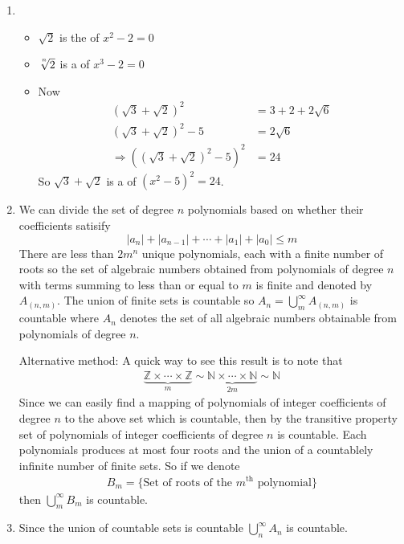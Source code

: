 \begin{enumerate}[label=(\alph*)]
    \item
    \begin{itemize}
        \item $\sqrt 2$ is the \soln of $x^2-2=0$
        \item $\sqrt[\uproot{3} n]{2}$ is a \soln of $x^3 - 2=0$
        \item 
        Now
        \begin{align*}
            (\sqrt 3 + \sqrt 2)^2 &= 3 + 2 + 2 \sqrt 6 \\
            (\sqrt 3 + \sqrt 2)^2 - 5 &= 2 \sqrt 6 \\
            \Rightarrow ((\sqrt 3 + \sqrt 2)^2 - 5)^2 &= 24
        \end{align*}
        So $\sqrt 3 + \sqrt 2$ is a \soln of $(x^2-5)^2 = 24$.
    \end{itemize}

    \item
    We can divide the set of degree $n$ polynomials based on whether their coefficients 
    satisify
    \begin{equation*}
        |a_n| + |a_{n-1}| + \cdots + |a_1| + |a_0| \leq m
    \end{equation*}
    There are less than $2m^n$ unique polynomials, each with a finite number of roots so 
    the set of algebraic numbers obtained from polynomials of degree $n$ with terms 
    summing to less than or equal to $m$ is finite and denoted by $A_{(n,m)}$. 
    The union of finite sets is countable so $A_n = \bigcup_m^{\infty} A_{(n,m)}$ is countable
    where $A_n$ denotes the set of all algebraic numbers obtainable from polynomials of 
    degree $n$.

    Alternative method:
    A quick way to see this result is to note that 
    \begin{align*}
        \underbrace{\mathbb{Z} \times \cdots \times \mathbb{Z}}_{m} \sim \underbrace{\mathbb{N} \times \cdots \times \mathbb{N}}_{2m} \sim \mathbb{N}
    \end{align*}
    Since we can easily find a mapping of polynomials of integer coefficients of degree $n$ to 
    the above set which is countable, then by the transitive property set of polynomials of integer coefficients 
    of degree $n$ is countable. Each polynomials produces at most four roots and the union of
    a countablely infinite number of finite sets. So if we denote
    \begin{align*}
        B_m = \{\text{Set of roots of the } m^{\text{th}} \text{ polynomial}\}
    \end{align*}
    then $\bigcup_m^\infty B_m$ is countable.

    \item 
    Since the union of countable sets is countable $\bigcup_n^\infty A_n$ is countable.
\end{enumerate}

